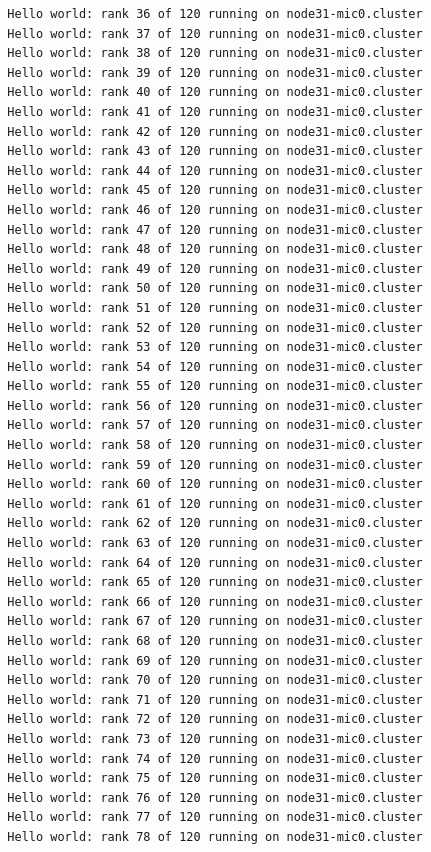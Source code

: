 \documentclass[pscyr,10pt]{hedlab}
\begin{document}
\begin{lstlisting}
  Hello world: rank 36 of 120 running on node31-mic0.cluster
  Hello world: rank 37 of 120 running on node31-mic0.cluster
  Hello world: rank 38 of 120 running on node31-mic0.cluster
  Hello world: rank 39 of 120 running on node31-mic0.cluster
  Hello world: rank 40 of 120 running on node31-mic0.cluster
  Hello world: rank 41 of 120 running on node31-mic0.cluster
  Hello world: rank 42 of 120 running on node31-mic0.cluster
  Hello world: rank 43 of 120 running on node31-mic0.cluster
  Hello world: rank 44 of 120 running on node31-mic0.cluster
  Hello world: rank 45 of 120 running on node31-mic0.cluster
  Hello world: rank 46 of 120 running on node31-mic0.cluster
  Hello world: rank 47 of 120 running on node31-mic0.cluster
  Hello world: rank 48 of 120 running on node31-mic0.cluster
  Hello world: rank 49 of 120 running on node31-mic0.cluster
  Hello world: rank 50 of 120 running on node31-mic0.cluster
  Hello world: rank 51 of 120 running on node31-mic0.cluster
  Hello world: rank 52 of 120 running on node31-mic0.cluster
  Hello world: rank 53 of 120 running on node31-mic0.cluster
  Hello world: rank 54 of 120 running on node31-mic0.cluster
  Hello world: rank 55 of 120 running on node31-mic0.cluster
  Hello world: rank 56 of 120 running on node31-mic0.cluster
  Hello world: rank 57 of 120 running on node31-mic0.cluster
  Hello world: rank 58 of 120 running on node31-mic0.cluster
  Hello world: rank 59 of 120 running on node31-mic0.cluster
  Hello world: rank 60 of 120 running on node31-mic0.cluster
  Hello world: rank 61 of 120 running on node31-mic0.cluster
  Hello world: rank 62 of 120 running on node31-mic0.cluster
  Hello world: rank 63 of 120 running on node31-mic0.cluster
  Hello world: rank 64 of 120 running on node31-mic0.cluster
  Hello world: rank 65 of 120 running on node31-mic0.cluster
  Hello world: rank 66 of 120 running on node31-mic0.cluster
  Hello world: rank 67 of 120 running on node31-mic0.cluster
  Hello world: rank 68 of 120 running on node31-mic0.cluster
  Hello world: rank 69 of 120 running on node31-mic0.cluster
  Hello world: rank 70 of 120 running on node31-mic0.cluster
  Hello world: rank 71 of 120 running on node31-mic0.cluster
  Hello world: rank 72 of 120 running on node31-mic0.cluster
  Hello world: rank 73 of 120 running on node31-mic0.cluster
  Hello world: rank 74 of 120 running on node31-mic0.cluster
  Hello world: rank 75 of 120 running on node31-mic0.cluster
  Hello world: rank 76 of 120 running on node31-mic0.cluster
  Hello world: rank 77 of 120 running on node31-mic0.cluster
  Hello world: rank 78 of 120 running on node31-mic0.cluster

\end{lstlisting}
\end{document}
